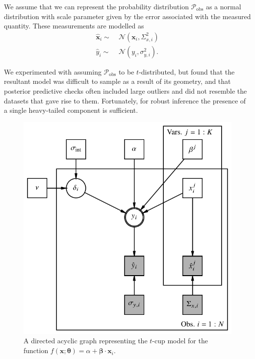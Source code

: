 \documentclass[fleqn,usenatbib]{rasti}
\newcommand{\depvar}{y_i}
\newcommand{\indepvars}{\boldsymbol{x}_i}
\newcommand{\obsdep}{\hat{y}_i}
\newcommand{\obsindep}{\hat{\boldsymbol{x}}_i}
\newcommand{\indepcov}{\Sigma_{x, i}}
\newcommand{\deperr}{\sigma_{y, i}}
\begin{document}
We assume that we can represent the probability distribution
$\mathcal P_{\text{obs}}$ as a normal distribution with scale parameter given by
the error associated with the measured quantity. These measurements are modelled
as
\begin{align}
    \obsindep \sim&\; \mathcal N\left({\indepvars}, \indepcov^2\right) \\
    \obsdep \sim&\; \mathcal N\left({\depvar}, \deperr^2\right).
\end{align}

We experimented with assuming $\mathcal P_{\text{obs}}$ to be $t$-distributed,
but found that the resultant model was difficult to sample as a result of its
geometry, and that posterior predictive checks often included large outliers and
did not resemble the datasets that gave rise to them.  Fortunately, for robust
inference the presence of a single heavy-tailed component is sufficient.

\begin{figure}
	\includegraphics[width=\columnwidth]{graphics/dag.pdf}
    \caption{A directed acyclic graph representing the $t$-cup model for the
    function $f(\boldsymbol{x}; \boldsymbol{\theta}) = \alpha +
    \boldsymbol{\beta} \cdot \boldsymbol{x}_i$.}
    \label{fig:formalism.dag}
\end{figure}
\end{document}

